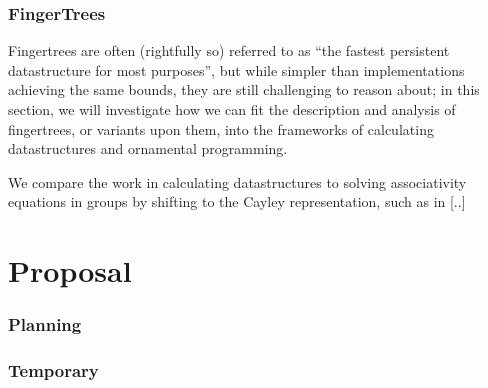\documentclass{article}
\theoremstyle{plain}%
\theoremstyle{definition}
\begin{document}
\section{FingerTrees}\label{sec:fingertrees}
Fingertrees are often (rightfully so) referred to as ``the fastest persistent datastructure for most purposes'', but while simpler than implementations achieving the same bounds, they are still challenging to reason about; in this section, we will investigate how we can fit the description and analysis of fingertrees, or variants upon them, into the frameworks of calculating datastructures and ornamental programming.

We compare the work in calculating datastructures to solving associativity equations in groups by shifting to the Cayley representation, such as in [..]




\part{Proposal}

\section{Planning}


\newpage
\section{Temporary}\label{sec:temp}
\listoftodos
%


\printbibliography
\end{document}
